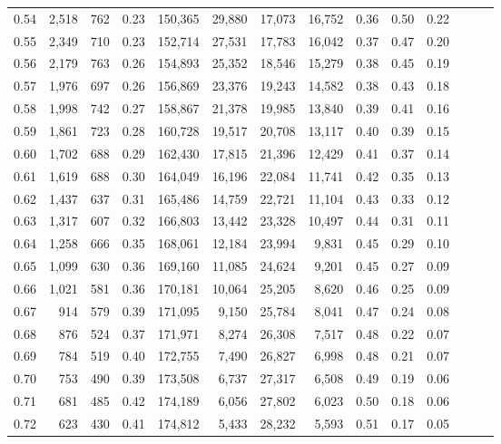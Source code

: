 \begin{tabular}{rrrrrrrrrrrrrr}
0.54 &  2,518 &  762 &  0.23 &  150,365 &   29,880 &  17,073 &  16,752 &  0.36 &  0.50 &      0.22 \\
0.55 &  2,349 &  710 &  0.23 &  152,714 &   27,531 &  17,783 &  16,042 &  0.37 &  0.47 &      0.20 \\
0.56 &  2,179 &  763 &  0.26 &  154,893 &   25,352 &  18,546 &  15,279 &  0.38 &  0.45 &      0.19 \\
0.57 &  1,976 &  697 &  0.26 &  156,869 &   23,376 &  19,243 &  14,582 &  0.38 &  0.43 &      0.18 \\
0.58 &  1,998 &  742 &  0.27 &  158,867 &   21,378 &  19,985 &  13,840 &  0.39 &  0.41 &      0.16 \\
0.59 &  1,861 &  723 &  0.28 &  160,728 &   19,517 &  20,708 &  13,117 &  0.40 &  0.39 &      0.15 \\
0.60 &  1,702 &  688 &  0.29 &  162,430 &   17,815 &  21,396 &  12,429 &  0.41 &  0.37 &      0.14 \\
0.61 &  1,619 &  688 &  0.30 &  164,049 &   16,196 &  22,084 &  11,741 &  0.42 &  0.35 &      0.13 \\
0.62 &  1,437 &  637 &  0.31 &  165,486 &   14,759 &  22,721 &  11,104 &  0.43 &  0.33 &      0.12 \\
0.63 &  1,317 &  607 &  0.32 &  166,803 &   13,442 &  23,328 &  10,497 &  0.44 &  0.31 &      0.11 \\
0.64 &  1,258 &  666 &  0.35 &  168,061 &   12,184 &  23,994 &   9,831 &  0.45 &  0.29 &      0.10 \\
0.65 &  1,099 &  630 &  0.36 &  169,160 &   11,085 &  24,624 &   9,201 &  0.45 &  0.27 &      0.09 \\
0.66 &  1,021 &  581 &  0.36 &  170,181 &   10,064 &  25,205 &   8,620 &  0.46 &  0.25 &      0.09 \\
0.67 &    914 &  579 &  0.39 &  171,095 &    9,150 &  25,784 &   8,041 &  0.47 &  0.24 &      0.08 \\
0.68 &    876 &  524 &  0.37 &  171,971 &    8,274 &  26,308 &   7,517 &  0.48 &  0.22 &      0.07 \\
0.69 &    784 &  519 &  0.40 &  172,755 &    7,490 &  26,827 &   6,998 &  0.48 &  0.21 &      0.07 \\
0.70 &    753 &  490 &  0.39 &  173,508 &    6,737 &  27,317 &   6,508 &  0.49 &  0.19 &      0.06 \\
0.71 &    681 &  485 &  0.42 &  174,189 &    6,056 &  27,802 &   6,023 &  0.50 &  0.18 &      0.06 \\
0.72 &    623 &  430 &  0.41 &  174,812 &    5,433 &  28,232 &   5,593 &  0.51 &  0.17 &      0.05 \\

\end{tabular}
